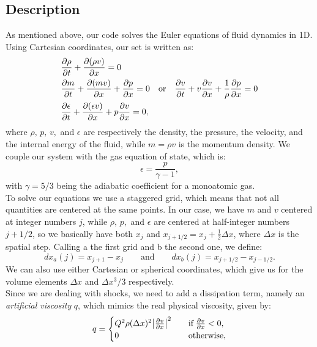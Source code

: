 \documentclass{article}
\begin{document}
\subsection{Description}\label{descrip}
As mentioned above, our code solves the Euler equations of fluid dynamics in 1D. Using Cartesian coordinates, our set is written as:
\begin{align}
	&\pdv{\rho}{t}+\pdv{(\rho v)}{x}=0 \label{eoc}\\
	&\pdv{m}{t}+\pdv{(mv)}{x}+\pdv{p}{x}=0\quad\text{or}\quad\pdv{v}{t}+v\pdv{v}{x}+\frac{1}{\rho}\pdv{p}{x}=0 \label{eom}\\
	&\pdv{\epsilon}{t}+\pdv{(\epsilon v)}{x}+p\pdv{v}{x}=0,\label{eoe}
\end{align}
where $\rho,\, p,\, v,$ and $\epsilon$ are respectively the density, the pressure, the velocity, and the internal energy of the fluid, while $m=\rho v$ is the momentum density. We couple our system with the gas equation of state, which is:
\begin{equation}\label{eqstate}
	\epsilon=\frac{p}{\gamma -1},
\end{equation}
with $\gamma=5/3$ being the adiabatic coefficient for a monoatomic gas.\\
To solve our equations we use a staggered grid, which means that not all quantities are centered at the same points. In our case, we have $m$ and $v$ centered at integer numbers $j$, while $\rho,\,p,$ and $\epsilon$ are centered at half-integer numbers $j+1/2$, so we basically have both $x_{j}$ and $x_{j+1/2}=x_{j}+\frac{1}{2}\Delta x$, where $\Delta x$ is the spatial step. 
Calling a the first grid and b the second one, we define:
\begin{equation*}
	dx_a(j)=x_{j+1}-x_{j} \qquad \text{and} \qquad dx_b(j)=x_{j+1/2}-x_{j-1/2}.
\end{equation*}
We can also use either Cartesian or spherical coordinates, which give us for the volume elements $\Delta x$ and $\Delta x^3/3$ respectively.\\
Since we are dealing with shocks, we need to add a dissipation term, namely an \textit{artificial viscosity} $q$, which mimics the real physical viscosity, given by:
\begin{equation}
	q=
	\begin{cases}
		Q^2 \rho(\Delta x)^2 \abs{\pdv{v}{x}}^2\quad &\text{if} \; \pdv{v}{x}<0,\\
		0 \quad &\text{otherwise},
	\end{cases}
\end{equation} 
\end{document}
